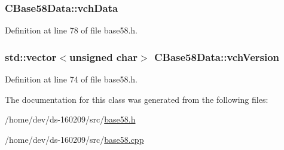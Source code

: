 \subsubsection[{vch\+Data}]{ C\+Base58\+Data\+::vch\+Data\hspace{0.3cm}{\ttfamily [protected]}}\label{class_c_base58_data_ae7ef7dfb93683aa4aaee8b74da5abb9c}


Definition at line 78 of file base58.\+h.

\hypertarget{class_c_base58_data_a110c1008f399053098a1bdf63408e923}{}
\subsubsection[{vch\+Version}]{\setlength{\rightskip}{0pt plus 5cm}std\+::vector$<$unsigned char$>$ C\+Base58\+Data\+::vch\+Version\hspace{0.3cm}{\ttfamily [protected]}}\label{class_c_base58_data_a110c1008f399053098a1bdf63408e923}


Definition at line 74 of file base58.\+h.



The documentation for this class was generated from the following files\+:\begin{DoxyCompactItemize}
\item 
/home/dev/ds-\/160209/src/\hyperlink{base58_8h}{base58.\+h}\item 
/home/dev/ds-\/160209/src/\hyperlink{base58_8cpp}{base58.\+cpp}\end{DoxyCompactItemize}
